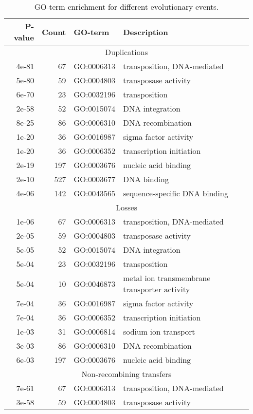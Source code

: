 \documentclass[english]{article}
\begin{document}
\begin{table}
\caption{\label{tab:go-events}
GO-term enrichment for different evolutionary events. }

\begin{tabular}{rrll}
P-value & Count & GO-term & Description \\
\hline
\multicolumn{4}{c}{Duplications} \\
\hline
4e-81 &  67 & GO:0006313 & transposition, DNA-mediated\\
5e-80 &  59 & GO:0004803 & transposase activity\\
6e-70 &  23 & GO:0032196 & transposition\\
2e-58 &  52 & GO:0015074 & DNA integration\\
8e-25 &  86 & GO:0006310 & DNA recombination\\
1e-20 &  36 & GO:0016987 & sigma factor activity\\
1e-20 &  36 & GO:0006352 & transcription initiation\\
2e-19 & 197 & GO:0003676 & nucleic acid binding\\
2e-10 & 527 & GO:0003677 & DNA binding\\
4e-06 & 142 & GO:0043565 & sequence-specific DNA binding\\
\hline
\hline
\multicolumn{4}{c}{Losses} \\
\hline
1e-06 &  67 & GO:0006313 & transposition, DNA-mediated\\
2e-05 &  59 & GO:0004803 & transposase activity\\
5e-05 &  52 & GO:0015074 & DNA integration\\
5e-04 &  23 & GO:0032196 & transposition\\
5e-04 &  10 & GO:0046873 & metal ion transmembrane transporter activity\\
7e-04 &  36 & GO:0016987 & sigma factor activity\\
7e-04 &  36 & GO:0006352 & transcription initiation\\
1e-03 &  31 & GO:0006814 & sodium ion transport\\
3e-03 &  86 & GO:0006310 & DNA recombination\\
6e-03 & 197 & GO:0003676 & nucleic acid binding\\
\hline
\hline
\multicolumn{4}{c}{Non-recombining transfers} \\
\hline
7e-61 &  67 & GO:0006313 & transposition, DNA-mediated\\
3e-58 &  59 & GO:0004803 & transposase activity\\

\end{tabular}
\end{table}
\end{document}
